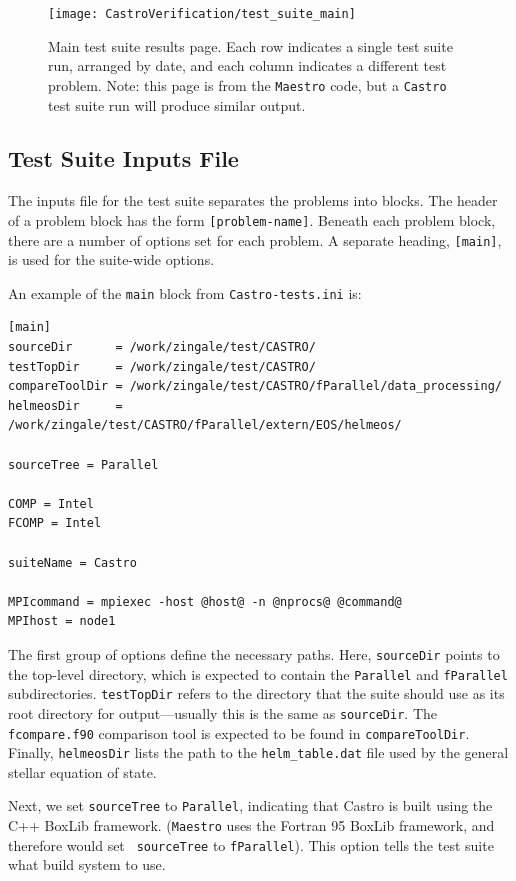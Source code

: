 \begin{figure}[t]
\centering
\texttt{[image: CastroVerification/test\_suite\_main]}
\caption{\label{fig:test_suite_main} Main test suite results page.  Each 
row indicates a single test suite run, arranged by date, and each column
indicates a different test problem.  Note: this page is from the {\tt Maestro}
code, but a {\tt Castro} test suite run will produce similar output.}
\end{figure}

\subsection{Test Suite Inputs File}

The inputs file for the test suite separates the problems into blocks.
The header of a problem block has the form {\tt [problem-name]}.
Beneath each problem block, there are a number of options set for each
problem.  A separate heading, {\tt [main]}, is used for the suite-wide
options.

An example of the {\tt main} block from {\tt Castro-tests.ini} is:
\begin{verbatim}
[main]
sourceDir      = /work/zingale/test/CASTRO/
testTopDir     = /work/zingale/test/CASTRO/
compareToolDir = /work/zingale/test/CASTRO/fParallel/data_processing/
helmeosDir     = /work/zingale/test/CASTRO/fParallel/extern/EOS/helmeos/

sourceTree = Parallel

COMP = Intel
FCOMP = Intel

suiteName = Castro

MPIcommand = mpiexec -host @host@ -n @nprocs@ @command@
MPIhost = node1
\end{verbatim}

The first group of options define the necessary paths.
Here, {\tt sourceDir} points to the top-level directory, which is
expected to contain the {\tt Parallel} and {\tt fParallel} subdirectories.
{\tt testTopDir} refers to the directory that the suite should use as
its root directory for output---usually this is the same as {\tt sourceDir}.
The {\tt fcompare.f90} comparison tool is expected to be found in
{\tt compareToolDir}.  Finally, {\tt helmeosDir} lists the path to the
{\tt helm\_table.dat} file used by the general stellar equation of state.

Next, we set {\tt sourceTree} to {\tt Parallel}, indicating that
Castro is built using the C++ BoxLib framework.  ({\tt Maestro} uses
the Fortran 95 BoxLib framework, and therefore would set {\tt
  sourceTree} to {\tt fParallel}).  This option tells the test suite
what build system to use.

